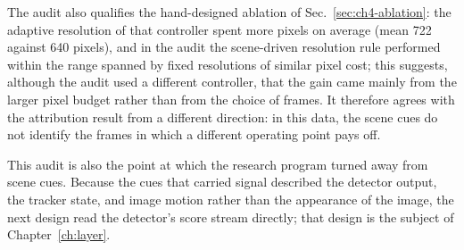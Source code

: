 The audit also qualifies the hand-designed ablation of Sec.~\ref{sec:ch4-ablation}: the adaptive resolution of that controller spent more pixels on average (mean 722 against 640 pixels), and in the audit the scene-driven resolution rule performed within the range spanned by fixed resolutions of similar pixel cost; this suggests, although the audit used a different controller, that the gain came mainly from the larger pixel budget rather than from the choice of frames. It therefore agrees with the attribution result from a different direction: in this data, the scene cues do not identify the frames in which a different operating point pays off.

This audit is also the point at which the research program turned away from scene cues. Because the cues that carried signal described the detector output, the tracker state, and image motion rather than the appearance of the image, the next design read the detector's score stream directly; that design is the subject of Chapter~\ref{ch:layer}.


